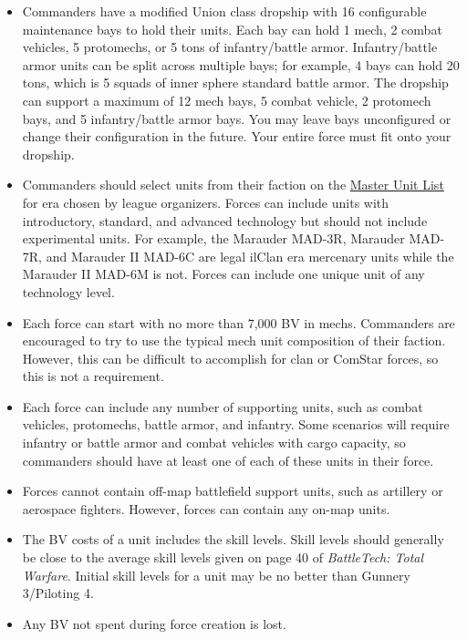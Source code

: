 \documentclass[UTF8]{article}
\begin{document}
\begin{itemize}

\item Commanders have a modified Union class dropship with 16 configurable maintenance bays to hold their units.
Each bay can hold 1 mech, 2 combat vehicles, 5 protomechs, or 5 tons of infantry/battle armor.
Infantry/battle armor units can be split across multiple bays; for example, 4 bays can hold 20 tons, which is 5 squads of inner sphere standard battle armor.
The dropship can support a maximum of 12 mech bays, 5 combat vehicle, 2 protomech bays, and 5 infantry/battle armor bays.
You may leave bays unconfigured or change their configuration in the future.
Your entire force must fit onto your dropship.

\item Commanders should select units from their faction on the \href{http://www.masterunitlist.info/}{Master Unit List} for era chosen by league organizers.
Forces can include units with introductory, standard, and advanced technology but should not include experimental units.
For example, the Marauder MAD-3R, Marauder MAD-7R, and Marauder II MAD-6C are legal ilClan era mercenary units while the Marauder II MAD-6M is not.
Forces can include one unique unit of any technology level.

\item Each force can start with no more than 7,000 BV in mechs.
Commanders are encouraged to try to use the typical mech unit composition of their faction.
However, this can be difficult to accomplish for clan or ComStar forces, so this is not a requirement.

\item Each force can include any number of supporting units, such as combat vehicles, protomechs, battle armor, and infantry.
Some scenarios will require infantry or battle armor and combat vehicles with cargo capacity, so commanders should have at least one of each of these units in their force.

\item Forces cannot contain off-map battlefield support units, such as artillery or aerospace fighters.
However, forces can contain any on-map units.

\item The BV costs of a unit includes the skill levels.
Skill levels should generally be close to the average skill levels given on page 40 of \emph{BattleTech: Total Warfare}.
Initial skill levels for a unit may be no better than Gunnery 3/Piloting 4.

\item Any BV not spent during force creation is lost.

\end{itemize}
\end{document}
